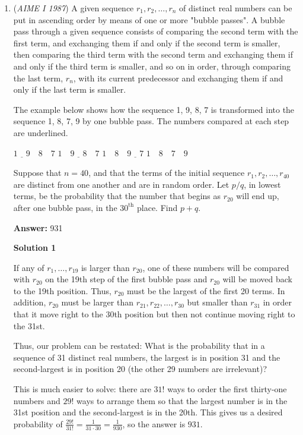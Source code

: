 \begin{enumerate}
 


	\item (\textit{AIME I 1987}) A given sequence $r_1, r_2, \dots, r_n$ of distinct real numbers can be put in ascending order by means of one or more "bubble passes".  A bubble pass through a given sequence consists of comparing the second term with the first term, and exchanging them if and only if the second term is smaller, then comparing the third term with the second term and exchanging them if and only if the third term is smaller, and so on in order, through comparing the last term, $r_n$, with its current predecessor and exchanging them if and only if the last term is smaller. 


 The example below shows how the sequence 1, 9, 8, 7 is transformed into the sequence 1, 8, 7, 9 by one bubble pass.  The numbers compared at each step are underlined.


 $\underline{1 \quad 9} \quad 8 \quad 7$
$1 \quad {}\underline{9 \quad 8} \quad 7$
$1 \quad 8 \quad \underline{9 \quad 7}$
$1 \quad 8 \quad 7 \quad 9$

 Suppose that $n = 40$, and that the terms of the initial sequence $r_1, r_2, \dots, r_{40}$ are distinct from one another and are in random order.  Let $p/q$, in lowest terms, be the probability that the number that begins as $r_{20}$ will end up, after one bubble pass, in the $30^{\mbox{th}}$ place.  Find $p + q$.


 
 \textbf{Answer: }931



\textbf{Solution 1}

If any of $r_1, \ldots, r_{19}$ is larger than $r_{20}$, one of these numbers will be compared with $r_{20}$ on the 19th step of the first bubble pass and $r_{20}$ will be moved back to the 19th position.  Thus, $r_{20}$ must be the largest of the first 20 terms.  In addition, $r_{20}$ must be larger than $r_{21}, r_{22}, \ldots, r_{30}$ but smaller than $r_{31}$ in order that it move right to the 30th position but then not continue moving right to the 31st.

 Thus, our problem can be restated: What is the probability that in a sequence of 31 distinct real numbers, the largest is in position 31 and the second-largest is in position 20 (the other 29 numbers are irrelevant)?

 This is much easier to solve: there are $31!$ ways to order the first thirty-one numbers and $29!$ ways to arrange them so that the largest number is in the 31st position and the second-largest is in the 20th. This gives us a desired probability of $\frac{29!}{31!} = \frac{1}{31\cdot 30} = \frac{1}{930}$, so the answer is $\boxed{931}$.


\end{enumerate}

